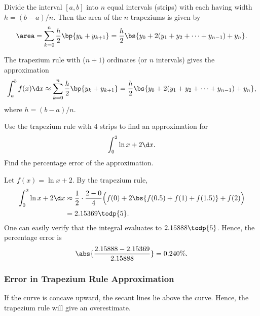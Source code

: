 Divide the interval $[a, b]$ into $n$ equal intervals (strips) with each having width $h = (b-a)/n$. Then the area of the $n$ trapeziums is given by \[\area = \sum_{k = 0}^n \frac{h}{2} \bp{y_k + y_{k+1}} = \frac{h}{2} \bs{y_0 + 2(y_1 + y_2 + \dots + y_{n-1}) + y_n}.\]

\begin{recipe}
    The trapezium rule with ($n+1$) ordinates (or $n$ intervals) gives the approximation \[\int_a^b f(x) \d x \approx \sum_{k = 0}^n \frac{h}{2} \bp{y_k + y_{k+1}} = \frac{h}{2} \bs{y_0 + 2(y_1 + y_2 + \dots + y_{n-1}) + y_n},\] where $h = (b-a)/n$.
\end{recipe}

\begin{sample}\label{samp:Trapezium-Rule}
    Use the trapezium rule with 4 strips to find an approximation for \[\int_0^2 \ln{x + 2} \d x.\] Find the percentage error of the approximation.
\end{sample}
\begin{sampans}
    Let $f(x) = \ln{x+2}$. By the trapezium rule,
    \begin{align*}
        \int_0^2 \ln{x + 2} \d x &\approx \frac{1}{2} \cdot \frac{2 - 0}{4} \Big(f(0) + 2\bs{f(0.5) + f(1) + f(1.5)} + f(2)\Big) \\
        &= 2.15369 \todp{5}.
    \end{align*}
    One can easily verify that the integral evaluates to $2.15888 \todp{5}$. Hence, the percentage error is \[\abs{\frac{2.15888 - 2.15369}{2.15888}} = 0.240 \%.\]
\end{sampans}

\subsubsection{Error in Trapezium Rule Approximation}

If the curve is concave upward, the secant lines lie above the curve. Hence, the trapezium rule will give an overestimate.

\begin{figure}[H]
    \centering
    \caption{}
\end{figure}

